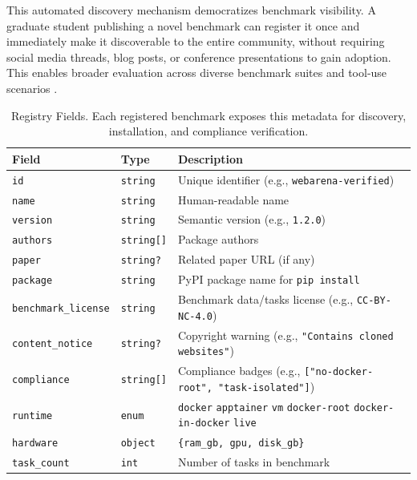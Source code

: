 \documentclass{article}
\theoremstyle{plain}
\theoremstyle{definition}
\theoremstyle{remark}
\begin{document}
This automated discovery mechanism democratizes benchmark visibility. A graduate student publishing a novel benchmark can register it once and immediately make it discoverable to the entire community, without requiring social media threads, blog posts, or conference presentations to gain adoption. This enables broader evaluation across diverse benchmark suites \citep{Liu2023AgentBenchEL, Ma2024AgentBoardAA, Wang2024GTAAB} and tool-use scenarios \citep{Wang2025MCPBenchBT, Lei2025MCPVerseAE, Luo2025MCPUniverseBL}.
\renewcommand{\arraystretch}{1.4}
\begin{table}[t]
\centering
\caption{Registry Fields. Each registered benchmark exposes this metadata for discovery, installation, and compliance verification.}
\scriptsize
{}
\begin{tabular}{L{2.8cm} L{2.2cm} L{8.5cm}}
\toprule
\textbf{Field} & \textbf{Type} & \textbf{Description} \\
\midrule
\texttt{id} & \texttt{string} & Unique identifier (e.g., \texttt{webarena-verified}) \\
\texttt{name} & \texttt{string} & Human-readable name \\
\texttt{version} & \texttt{string} & Semantic version (e.g., \texttt{1.2.0}) \\
\texttt{authors} & \texttt{string[]} & Package authors \\
\texttt{paper} & \texttt{string?} & Related paper URL (if any) \\
\texttt{package} & \texttt{string} & PyPI package name for \texttt{pip install} \\
\texttt{benchmark\_license} & \texttt{string} & Benchmark data/tasks license (e.g., \texttt{CC-BY-NC-4.0}) \\
\texttt{content\_notice} & \texttt{string?} & Copyright warning (e.g., \texttt{"Contains cloned websites"}) \\
\texttt{compliance} & \texttt{string[]} & Compliance badges (e.g., \texttt{["no-docker-root", "task-isolated"]}) \\
\texttt{runtime} & \texttt{enum} & \texttt{docker} \textbar{} \texttt{apptainer} \textbar{} \texttt{vm} \textbar{} \texttt{docker-root} \textbar{} \texttt{docker-in-docker} \textbar{} \texttt{live} \\
\texttt{hardware} & \texttt{object} & \texttt{\{ram\_gb, gpu, disk\_gb\}} \\
\texttt{task\_count} & \texttt{int} & Number of tasks in benchmark \\
\bottomrule
\end{tabular}
\label{tab:registry-fields}
\end{table}
\end{document}
